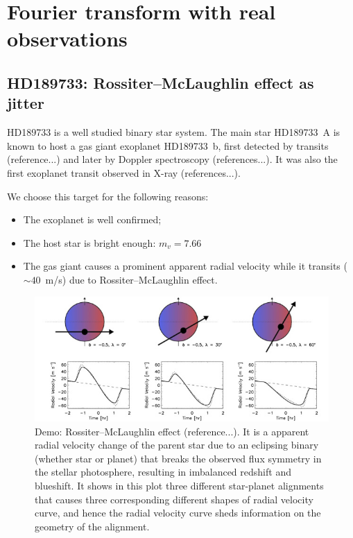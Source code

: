 \section{Fourier transform with real observations}
\label{\thesection}
\label{sec:observation}

\subsection{HD189733: Rossiter–McLaughlin effect as jitter}

HD189733 is a well studied binary star system. The main star HD189733~A is known to host a gas giant
exoplanet HD189733~b, first detected by transits (reference...) and later by Doppler spectroscopy (references...). 
It was also the first exoplanet transit observed in X-ray (references...). 

We choose this target for the following reasons:
\begin{itemize}
	\item The exoplanet is well confirmed;
	\item The host star is bright enough: $m_v=7.66$
	\item The gas giant causes a prominent apparent radial velocity while it transits ($\sim 40$~m/s)
	due to Rossiter–McLaughlin effect.
\end{itemize}

\begin{figure}[tbp]
\centering
\includegraphics[width = 0.80 \linewidth]
{./Figures/Methods/rmeffect.jpg}
\caption[Demo: Rossiter–McLaughlin effect]
{Demo: Rossiter–McLaughlin effect (reference...). It is a apparent radial velocity
	change of the parent star due to an eclipsing binary (whether star or planet) that breaks the observed flux symmetry in the 
	stellar photosphere, resulting in imbalanced redshift and blueshift. It shows in this plot three different star-planet 
	alignments that causes three corresponding different shapes of radial velocity curve, and hence the radial velocity curve
	sheds information on the geometry of the alignment.}
\label{fig:rm-effect}
\end{figure} 

